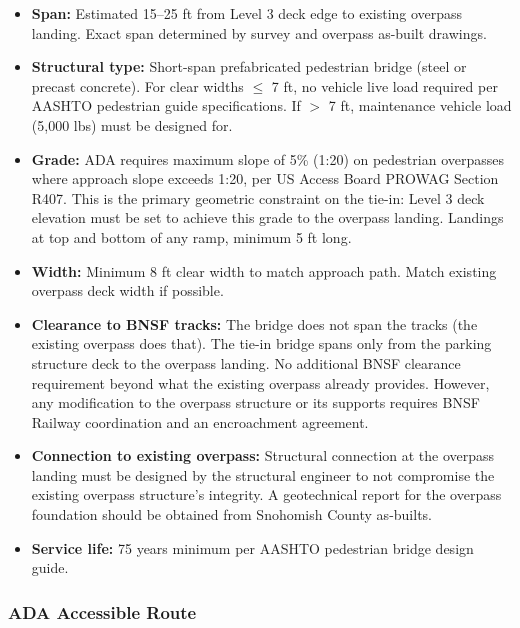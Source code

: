 \documentclass[11pt,letterpaper]{article}
\begin{document}
\begin{itemize}
  \item \textbf{Span:} Estimated 15--25 ft from Level 3 deck edge to existing overpass landing. Exact span determined by survey and overpass as-built drawings.
  \item \textbf{Structural type:} Short-span prefabricated pedestrian bridge (steel or precast concrete). For clear widths $\leq$ 7 ft, no vehicle live load required per AASHTO pedestrian guide specifications. If $>$ 7 ft, maintenance vehicle load (5,000 lbs) must be designed for.
  \item \textbf{Grade:} ADA requires maximum slope of 5\% (1:20) on pedestrian overpasses where approach slope exceeds 1:20, per US Access Board PROWAG Section R407. This is the primary geometric constraint on the tie-in: Level 3 deck elevation must be set to achieve this grade to the overpass landing. Landings at top and bottom of any ramp, minimum 5 ft long.
  \item \textbf{Width:} Minimum 8 ft clear width to match approach path. Match existing overpass deck width if possible.
  \item \textbf{Clearance to BNSF tracks:} The bridge does not span the tracks (the existing overpass does that). The tie-in bridge spans only from the parking structure deck to the overpass landing. No additional BNSF clearance requirement beyond what the existing overpass already provides. However, any modification to the overpass structure or its supports requires BNSF Railway coordination and an encroachment agreement.
  \item \textbf{Connection to existing overpass:} Structural connection at the overpass landing must be designed by the structural engineer to not compromise the existing overpass structure's integrity. A geotechnical report for the overpass foundation should be obtained from Snohomish County as-builts.
  \item \textbf{Service life:} 75 years minimum per AASHTO pedestrian bridge design guide.
\end{itemize}

\subsubsection{ADA Accessible Route}
\end{document}
